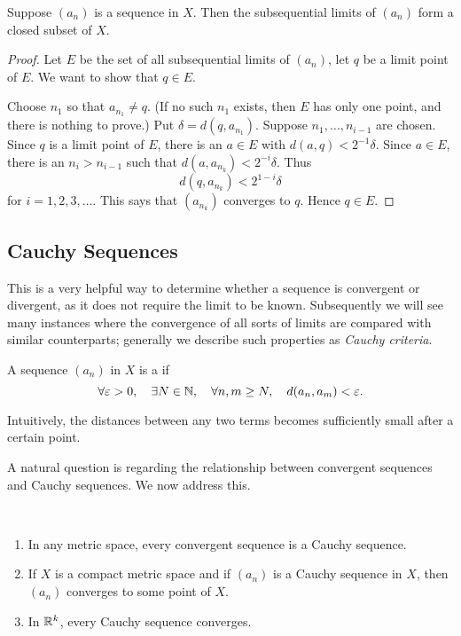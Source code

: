 \begin{lemma}
Suppose $(a_n)$ is a sequence in $X$. Then the subsequential limits of $(a_n)$ form a closed subset of $X$.
\end{lemma}

\begin{proof}
Let $E$ be the set of all subsequential limits of $(a_n)$, let $q$ be a limit point of $E$. We want to show that $q\in E$.

Choose $n_1$ so that $a_{n_1}\neq q$. (If no such $n_1$ exists, then $E$ has only one point, and there is nothing to prove.) Put $\delta=d(q,a_{n_1})$. Suppose $n_1,\dots,n_{i-1}$ are chosen. Since $q$ is a limit point of $E$, there is an $a\in E$ with $d(a,q)<2^{-1}\delta$. Since $a\in E$, there is an $n_i>n_{i-1}$ such that $d(a,a_{n_k})<2^{-i}\delta$. Thus
\[d(q,a_{n_k})<2^{1-i}\delta\]
for $i=1,2,3,\dots$. This says that $(a_{n_k})$ converges to $q$. Hence $q\in E$.
\end{proof}
\pagebreak

\subsection{Cauchy Sequences}
This is a very helpful way to determine whether a sequence is convergent or divergent, as it does not require the limit to be known. 
Subsequently we will see many instances where the convergence of all sorts of limits are compared with similar counterparts; generally we describe such properties as \emph{Cauchy criteria}.

\begin{definition}
A sequence $(a_n)$ in $X$ is a  if 
\[\forall\varepsilon>0,\quad\exists N\in\mathbb N,\quad\forall n,m\ge N,\quad d(a_n,a_m)<\varepsilon.\]
\end{definition}

\begin{remark}
Intuitively, the distances between any two terms becomes sufficiently small after a certain point.
\end{remark}

A natural question is regarding the relationship between convergent sequences and Cauchy sequences. We now address this.

\begin{proposition} \
\begin{enumerate}[label=(\roman*)]
\item In any metric space, every convergent sequence is a Cauchy sequence.
\item If $X$ is a compact metric space and if $(a_n)$ is a Cauchy sequence in $X$, then $(a_n)$ converges to some point of $X$.
\item In $\mathbb R^k$, every Cauchy sequence converges. 
\end{enumerate}
\end{proposition}

